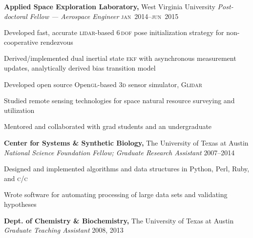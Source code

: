 \documentclass[12pt,letterpaper]{article}
\newenvironment{itemize*}%
{\begin{itemize}%
  \setlength{\itemsep}{0pt}}%
{\end{itemize}}
\newcommand{\Cpp}{\textsc{c}\nolinebreak[4]\hspace{-.05em}\raisebox{.4ex}{\relsize{-3}{\textbf{++}}}}
\newcommand{\mhead}[1]{\leavevmode\marginpar{\sffamily\footnotesize #1}}
\newcommand{\rdate}[1]{{\hfill #1}}
\begin{document}
\bigskip
\mhead{Academic \newline Appointments}%
\textbf{Applied Space Exploration Laboratory,} West Virginia University \newline
\emph{Post-doctoral Fellow --- Aerospace Engineer} \rdate{\textsc{jan}~2014--\textsc{jun}~2015}
\begin{itemize*}
  \item Developed fast, accurate \textsc{lidar}-based \textsc{6\,dof} pose initialization strategy for non-cooperative rendezvous
  \item Derived/implemented dual inertial state \textsc{ekf} with asynchronous measurement updates, analytically derived bias transition model
  \item Developed open source Open\textsc{gl}-based \textsc{3d} sensor simulator, \textsc{Glidar}
  \item Studied remote sensing technologies for space natural resource surveying and utilization
  \item Mentored and collaborated with grad students and an undergraduate
\end{itemize*}

\medskip
\textbf{Center for Systems \& Synthetic Biology,} The University of Texas at Austin\newline
\emph{National Science Foundation Fellow; Graduate Research Assistant}  \rdate{2007--2014}
\begin{itemize*}
  \item Designed and implemented algorithms and data structures in Python, Perl, Ruby, and \textsc{c}/\Cpp
  \item Wrote software for automating processing of large data sets and validating hypotheses%
\end{itemize*}

\medskip
\textbf{Dept. of Chemistry \& Biochemistry,} The University of Texas at Austin\newline
\emph{Graduate Teaching Assistant} \rdate{2008, 2013}
\end{document}
